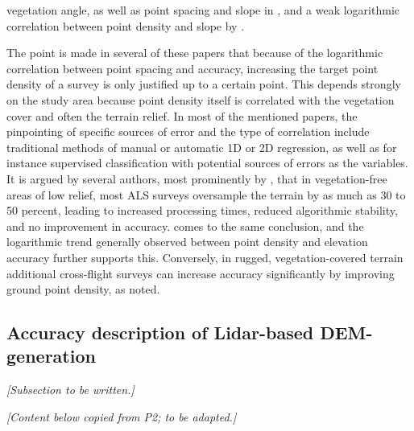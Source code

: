 vegetation angle, as well as point spacing and slope in \cite{peng_shih_2006}, and a weak logarithmic correlation between point density and slope by \cite{chow_hodgson_2009}.

The point is made in several of these papers that because of the logarithmic correlation between point spacing and accuracy, increasing the target point density of a survey is only justified up to a certain point. This depends strongly on the study area because point density itself is correlated with the vegetation cover and often the terrain relief. In most of the mentioned papers, the pinpointing of specific sources of error and the type of correlation include traditional methods of manual or automatic 1D or 2D regression, as well as for instance supervised classification with potential sources of errors as the variables. It is argued by several authors, most prominently by \cite{guo_etal_2010}, that in vegetation-free areas of low relief, most ALS surveys oversample the terrain by as much as 30 to 50 percent, leading to increased processing times, reduced algorithmic stability, and no improvement in accuracy. \cite{bater_coops_2009} comes to the same conclusion, and the logarithmic trend generally observed between point density and elevation accuracy further supports this. Conversely, in rugged, vegetation-covered terrain additional cross-flight surveys can increase accuracy significantly by improving ground point density, as \cite{peng_shih_2006} noted.

\subsection{Accuracy description of Lidar-based DEM-generation}
\label{sub:lidaraccuracy_dem}

\textit{[Subsection to be written.]}

\textit{[Content below copied from P2; to be adapted.]}

